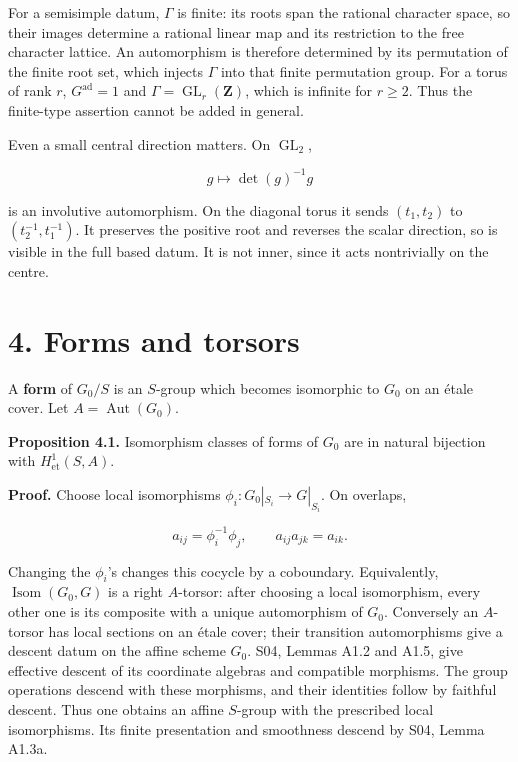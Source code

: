 \documentclass[11pt,a4paper,openany]{report}
\begin{document}
For a semisimple datum, \(\Gamma\) is finite: its roots span the rational character space, so their images determine a rational linear map and its restriction to the free character lattice. An automorphism is therefore determined by its permutation of the finite root set, which injects \(\Gamma\) into that finite permutation group. For a torus of rank \(r\), \(G^{\mathrm{ad}}=1\) and \(\Gamma=\operatorname{GL}_r(\mathbf Z)\), which is infinite for \(r\geq2\). Thus the finite-type assertion cannot be added in general.

Even a small central direction matters. On \(\operatorname{GL}_2\),

\[
g\longmapsto\det(g)^{-1}g
\tag{3.2}
\]

is an involutive automorphism. On the diagonal torus it sends \((t_1,t_2)\) to \((t_2^{-1},t_1^{-1})\). It preserves the positive root and reverses the scalar direction, so is visible in the full based datum. It is not inner, since it acts nontrivially on the centre.

\section{4. Forms and torsors}\label{AG-RG-06-forms-and-torsors}

A \textbf{form} of \(G_0/S\) is an \(S\)-group which becomes isomorphic to \(G_0\) on an étale cover. Let \(A=\operatorname{Aut}(G_0)\).

\textbf{Proposition 4.1.} Isomorphism classes of forms of \(G_0\) are in natural bijection with \(H^1_{\mathrm{et}}(S,A)\).

\textbf{Proof.} Choose local isomorphisms \(\phi_i:G_0|_{S_i}\to G|_{S_i}\). On overlaps,

\[
a_{ij}=\phi_i^{-1}\phi_j,
\qquad a_{ij}a_{jk}=a_{ik}.
\]

Changing the \(\phi_i\)'s changes this cocycle by a coboundary. Equivalently, \(\operatorname{Isom}(G_0,G)\) is a right \(A\)-torsor: after choosing a local isomorphism, every other one is its composite with a unique automorphism of \(G_0\). Conversely an \(A\)-torsor has local sections on an étale cover; their transition automorphisms give a descent datum on the affine scheme \(G_0\). S04, Lemmas A1.2 and A1.5, give effective descent of its coordinate algebras and compatible morphisms. The group operations descend with these morphisms, and their identities follow by faithful descent. Thus one obtains an affine \(S\)-group with the prescribed local isomorphisms. Its finite presentation and smoothness descend by S04, Lemma A1.3a.
\end{document}

